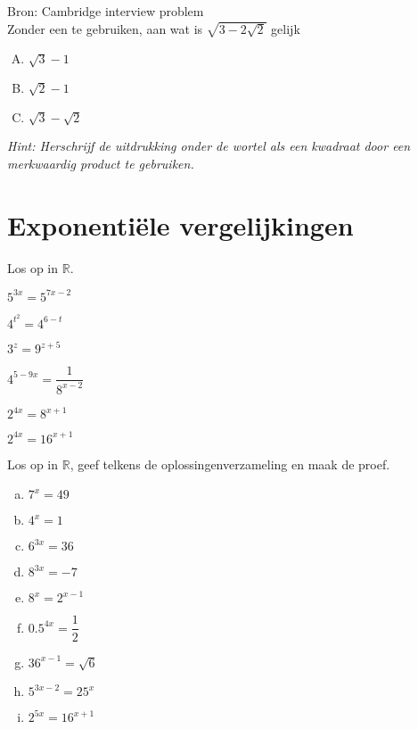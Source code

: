 \documentclass[12pt,twoside]{article}
\begin{document}
\begin{oefening}{\scriptsize Bron: Cambridge interview problem}\\
  Zonder een  te gebruiken, aan wat is  $\displaystyle\sqrt{3 - 2\sqrt{2}}$  gelijk
  \begin{enumerate}[(A)]
  \item $\sqrt{3}-1$
  \item $\sqrt{2}-1$
  \item $\sqrt{3}-\sqrt{2}$
  \end{enumerate}
  {\em Hint: Herschrijf de uitdrukking onder de wortel als een kwadraat door een merkwaardig product te gebruiken.}
\end{oefening}

\pagebreak
\section{Exponentiële vergelijkingen}

\begin{oefening}
Los op in $\mathbb{R}$.
\begin{exlist}{3}
  \item $5^{3x}=5^{7x-2}$
  \item $4^{t^2}=4^{6-t}$
  \item $3^z=9^{z+5}$
  \item $4^{5-9x}=\dfrac{1}{8^{x-2}}$
  \item $2^{4x}=8^{x+1}$
  \item $2^{4x}=16^{x+1}$
\end{exlist}
\end{oefening}


\begin{oefening}
Los op in $\mathbb{R}$, geef telkens de oplossingenverzameling en maak de proef.
\begin{multicols}{3}
\begin{enumerate}[(a)]
  \itemsep.5em
  \item $7^x=49$
  \item $4^x=1$
  \item $6^{3x}=36$
  \item $8^{3x}=-7$
  \item $8^x=2^{x-1}$
  \item $0.5^{4x}=\dfrac{1}{2}$
  \item $36^{x-1}=\sqrt{6}$
  \item $5^{3x-2}=25^x$
  \item $2^{5x}=16^{x+1}$
\end{enumerate}
\end{multicols}
\end{oefening}
\end{document}
